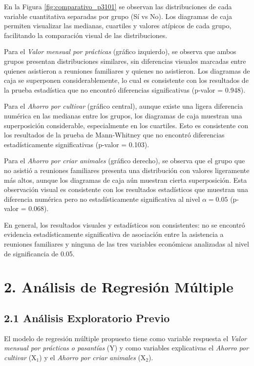 \documentclass[12pt,a4paper]{article}
\begin{document}
En la Figura \ref{fig:comparativo_p3101} se observan las distribuciones de cada variable cuantitativa separadas por grupo (Sí vs No). Los diagramas de caja permiten visualizar las medianas, cuartiles y valores atípicos de cada grupo, facilitando la comparación visual de las distribuciones. 

Para el \textit{Valor mensual por prácticas} (gráfico izquierdo), se observa que ambos grupos presentan distribuciones similares, sin diferencias visuales marcadas entre quienes asistieron a reuniones familiares y quienes no asistieron. Los diagramas de caja se superponen considerablemente, lo cual es consistente con los resultados de la prueba estadística que no encontró diferencias significativas (p-valor = 0.948).

Para el \textit{Ahorro por cultivar} (gráfico central), aunque existe una ligera diferencia numérica en las medianas entre los grupos, los diagramas de caja muestran una superposición considerable, especialmente en los cuartiles. Esto es consistente con los resultados de la prueba de Mann-Whitney que no encontró diferencias estadísticamente significativas (p-valor = 0.103).

Para el \textit{Ahorro por criar animales} (gráfico derecho), se observa que el grupo que no asistió a reuniones familiares presenta una distribución con valores ligeramente más altos, aunque los diagramas de caja aún muestran cierta superposición. Esta observación visual es consistente con los resultados estadísticos que muestran una diferencia numérica pero no estadísticamente significativa al nivel $\alpha = 0.05$ (p-valor = 0.068).

En general, los resultados visuales y estadísticos son consistentes: no se encontró evidencia estadísticamente significativa de asociación entre la asistencia a reuniones familiares y ninguna de las tres variables económicas analizadas al nivel de significancia de 0.05.

\section*{2. Análisis de Regresión Múltiple}

\subsection*{2.1 Análisis Exploratorio Previo}

El modelo de regresión múltiple propuesto tiene como variable respuesta el \textit{Valor mensual por prácticas o pasantías} (Y) y como variables explicativas el \textit{Ahorro por cultivar} (X$_1$) y el \textit{Ahorro por criar animales} (X$_2$). 
\end{document}
